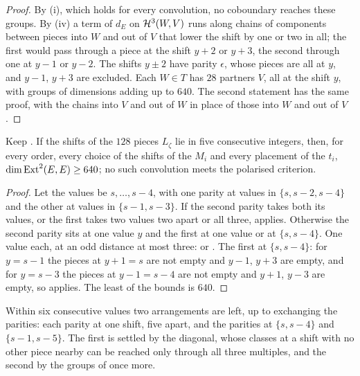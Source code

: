 \begin{proof}
By (i), which holds for every convolution, no
coboundary reaches these groups. By (iv) a term of
$d_{E}$ on $\mathcal{H}^{3}(W,V)$ runs along chains of components between pieces
into $W$ and out of $V$ that lower the shift by one or two in all; the
first would pass through a piece at the shift $y+2$ or $y+3$, the second
through one at $y-1$ or $y-2$. The shifts $y\pm2$ have parity $\epsilon$,
whose pieces are all at $y$, and $y-1$, $y+3$ are excluded. Each $W\in T$
has $28$ partners $V$, all at the shift $y$, with groups of dimensions adding
up to $640$. The second statement has the same proof, with the chains into
$V$ and out of $W$ in place of those into $W$ and out of $V$.
\end{proof}

\begin{corollary}\label{cor:efourfive}
Keep . If the shifts of the $128$ pieces $L_{\zeta}$
lie in five consecutive integers, then, for every order, every choice of the
shifts of the $M_{i}$ and every placement of the $t_{i}$,
$\dim\operatorname{Ext}^{2}(E,E)\ge640$; no such convolution meets the polarised
criterion.
\end{corollary}

\begin{proof}
Let the values be $s,\dots,s-4$, with one parity at values in
$\{s,s-2,s-4\}$ and the other at values in $\{s-1,s-3\}$. If the second
parity takes both its values, or the first takes two values two apart or all
three,  applies. Otherwise the second parity sits at
one value $y$ and the first at one value or at $\{s,s-4\}$. One value each,
at an odd distance at most three:  or
. The first at $\{s,s-4\}$: for $y=s-1$ the
pieces at $y+1=s$ are not empty and $y-1$, $y+3$ are empty, and for $y=s-3$
the pieces at $y-1=s-4$ are not empty and $y+1$, $y-3$ are empty, so
 applies. The least of the bounds is $640$.
\end{proof}

Within six consecutive values two arrangements are left, up to exchanging
the parities: each parity at one shift, five apart, and the parities at
$\{s,s-4\}$ and $\{s-1,s-5\}$. The first is settled by the diagonal, whose
classes at a shift with no other piece nearby can be reached only through
all three multiples, and the second by the groups of
 once more.

